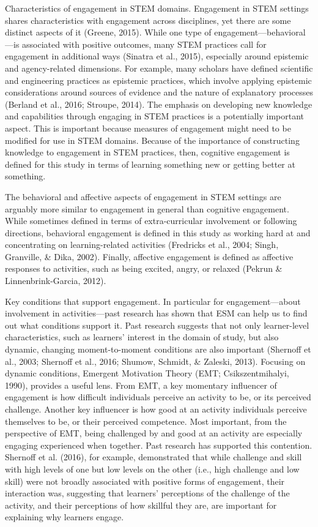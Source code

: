 \documentclass[]{book}
\theoremstyle{definition}
\theoremstyle{definition}
\theoremstyle{definition}
\theoremstyle{remark}
\begin{document}
Characteristics of engagement in STEM domains. Engagement in STEM
settings shares characteristics with engagement across disciplines, yet
there are some distinct aspects of it (Greene, 2015). While one type of
engagement---behavioral---is associated with positive outcomes, many
STEM practices call for engagement in additional ways (Sinatra et al.,
2015), especially around epistemic and agency-related dimensions. For
example, many scholars have defined scientific and engineering practices
as epistemic practices, which involve applying epistemic considerations
around sources of evidence and the nature of explanatory processes
(Berland et al., 2016; Stroupe, 2014). The emphasis on developing new
knowledge and capabilities through engaging in STEM practices is a
potentially important aspect. This is important because measures of
engagement might need to be modified for use in STEM domains. Because of
the importance of constructing knowledge to engagement in STEM
practices, then, cognitive engagement is defined for this study in terms
of learning something new or getting better at something.

The behavioral and affective aspects of engagement in STEM settings are
arguably more similar to engagement in general than cognitive
engagement. While sometimes defined in terms of extra-curricular
involvement or following directions, behavioral engagement is defined in
this study as working hard at and concentrating on learning-related
activities (Fredricks et al., 2004; Singh, Granville, \& Dika, 2002).
Finally, affective engagement is defined as affective responses to
activities, such as being excited, angry, or relaxed (Pekrun \&
Linnenbrink-Garcia, 2012).

Key conditions that support engagement. In particular for
engagement---about involvement in activities---past research has shown
that ESM can help us to find out what conditions support it. Past
research suggests that not only learner-level characteristics, such as
learners' interest in the domain of study, but also dynamic, changing
moment-to-moment conditions are also important (Shernoff et al., 2003;
Shernoff et al., 2016; Shumow, Schmidt, \& Zaleski, 2013). Focusing on
dynamic conditions, Emergent Motivation Theory (EMT; Csikszentmihalyi,
1990), provides a useful lens. From EMT, a key momentary influencer of
engagement is how difficult individuals perceive an activity to be, or
its perceived challenge. Another key influencer is how good at an
activity individuals perceive themselves to be, or their perceived
competence. Most important, from the perspective of EMT, being
challenged by and good at an activity are especially engaging
experienced when together. Past research has supported this contention.
Shernoff et al. (2016), for example, demonstrated that while challenge
and skill with high levels of one but low levels on the other (i.e.,
high challenge and low skill) were not broadly associated with positive
forms of engagement, their interaction was, suggesting that learners'
perceptions of the challenge of the activity, and their perceptions of
how skillful they are, are important for explaining why learners engage.
\end{document}
